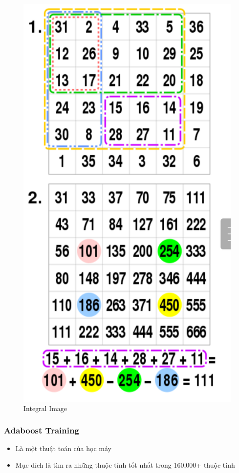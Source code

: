 \documentclass[a4paper]{article}
\begin{document}
\begin{figure} [H]
    \centering
    \includegraphics[scale=0.45]{integral_image.png}
    \caption{ Integral Image }
    \label{fig:integral_image}
\end{figure}

\subsubsection{Adaboost Training}
\begin{itemize}
    \item Là một thuật toán của học máy
    \item Mục đích là tìm ra những thuộc tính tốt nhất trong 160,000+ thuộc tính 
\end{itemize}
\end{document}
